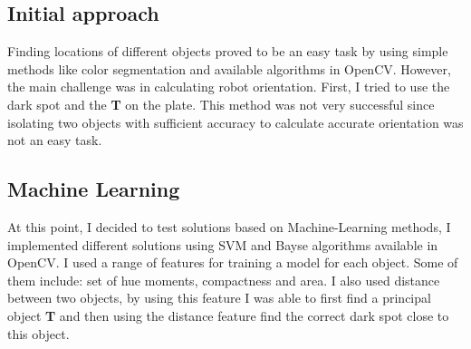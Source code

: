 \documentclass[conference,12pt]{IEEEtran}
\begin{document}
\subsection{Initial approach}
Finding locations of different objects proved to be an easy task by using simple methods like color segmentation and available algorithms in OpenCV. However, the main challenge was in calculating robot orientation. First, I tried to use the dark spot and the \textbf{T} on the plate. This method was not very successful since isolating two objects with sufficient accuracy to calculate accurate orientation was not an easy task.
\subsection{Machine Learning}
At this point, I decided to test solutions based on Machine-Learning methods, I implemented different solutions using SVM and Bayse algorithms available in OpenCV. I used a range of features for training a model for each object. Some of them include: set of hue moments, compactness and area. I also used distance between two objects, by using this feature I was able to first find a principal object \textbf{T} and then using the distance feature find the correct dark spot close to this object.
\end{document}

